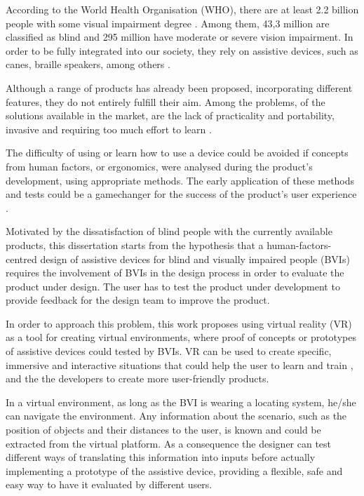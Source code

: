 

According to the World Health Organisation (WHO), there are at least 2.2 billion people with some visual impairment degree \cite{world2019world}. Among them, 43,3 million are classified as blind and 295 million have moderate or severe vision impairment. In order to be fully integrated into our society, they rely on assistive devices, such as canes, braille speakers, among others \cite{bourne2021trends}. 

Although a range of products has already been proposed, incorporating different features, they do not entirely fulfill their aim. Among the problems, of the solutions available in the market, are the lack of practicality and portability, invasive and requiring too much effort to learn \cite{lozano2009electrotactile}.

The difficulty of using or learn how to use a device could be avoided if concepts from human factors, or ergonomics, were analysed during the product’s development, using appropriate methods. The early application of these methods and tests could be a gamechanger for the success of the product's user experience \cite{wolf2019towards}.

Motivated by the dissatisfaction of blind people with the currently available products, this dissertation starts from the hypothesis that a human-factors-centred design of assistive devices for blind and visually impaired people (BVIs) requires the involvement of BVIs in the design process in order to evaluate the product under design. The user has to test the product under development to provide feedback for the design team to improve the product.

In order to approach this problem, this work proposes using virtual reality (VR) as a tool for creating virtual environments, where proof of concepts or prototypes of assistive devices could tested by BVIs. VR can be used to create specific, immersive and interactive situations that could help the user to learn and train \cite{farrell2018learning}, and the the developers to create more user-friendly products.

In a virtual environment, as long as the BVI is wearing a locating system, he/she can navigate the environment. Any information about the scenario, such as the position of objects and their distances to the user, is known and could be extracted from the virtual platform. As a consequence the designer can test different ways of translating this information into inputs before actually implementing a prototype of the assistive device, providing a flexible, safe and easy way to have it evaluated by different users.


